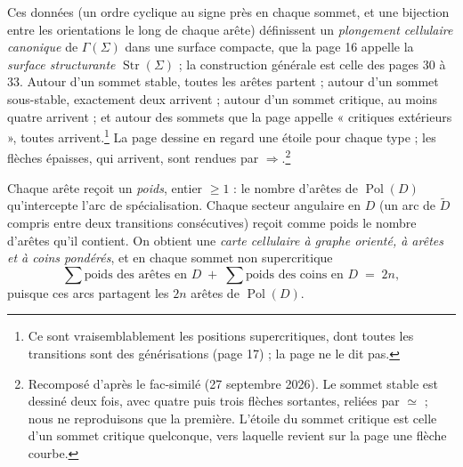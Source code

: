 \documentclass[11pt,a4paper]{article}
\begin{document}
Ces données (un ordre cyclique au signe près en chaque sommet, et une bijection
entre les orientations le long de chaque arête) définissent un
\emph{plongement cellulaire canonique} de $\Gamma(\Sigma)$ dans une surface
compacte, que la page 16 appelle la \emph{surface structurante}
$\operatorname{Str}(\Sigma)$ ; la construction générale est celle des pages 30 à
33. Autour d'un sommet stable, toutes les arêtes partent ; autour d'un sommet
sous-stable, exactement deux arrivent ; autour d'un sommet critique, au moins
quatre arrivent ; et autour des sommets que la page appelle « critiques
extérieurs », toutes arrivent.\footnote{Ce sont vraisemblablement les positions
supercritiques, dont toutes les transitions sont des générisations (page 17) ;
la page ne le dit pas.} La page dessine en regard une étoile pour chaque type ;
les flèches épaisses, qui arrivent, sont rendues par $\Rightarrow$.\footnote{Recomposé
d'après le fac-similé (27 septembre 2026). Le sommet stable est dessiné deux
fois, avec quatre puis trois flèches sortantes, reliées par $\simeq$ ; nous ne
reproduisons que la première. L'étoile du sommet critique est celle d'un sommet
critique quelconque, vers laquelle revient sur la page une flèche courbe.}


Chaque arête reçoit un \emph{poids}, entier $\geqslant 1$ : le nombre d'arêtes
de $\operatorname{Pol}(D)$ qu'intercepte l'arc de spécialisation. Chaque secteur
angulaire en $D$ (un arc de $\widetilde{D}$ compris entre deux transitions
consécutives) reçoit comme poids le nombre d'arêtes qu'il contient. On obtient
une \emph{carte cellulaire à graphe orienté, à arêtes et à coins pondérés}, et
en chaque sommet non supercritique
\[
\sum \text{poids des arêtes en } D \;+\; \sum \text{poids des coins en } D
\;=\; 2n,
\]
puisque ces arcs partagent les $2n$ arêtes de $\operatorname{Pol}(D)$.
\end{document}
